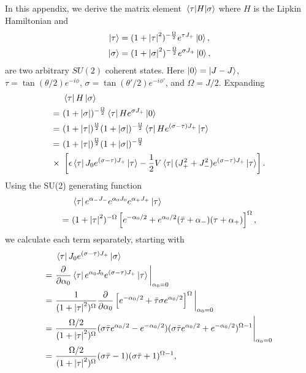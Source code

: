 \documentclass[10pt]{article}
\begin{document}
\begin{appendices}
In this appendix, we derive the matrix element $\mel{\tau}{H}{\sigma}$ where $H$ is the Lipkin Hamiltonian and
\begin{align}
\ket{\tau}&=(1+\abs{\tau}^2)^{-\frac{\Omega}{2}}e^{\tau J_+}\ket{0},
\\
\ket{\sigma}&=(1+\abs{\sigma}^2)^{-\frac{\Omega}{2}}e^{\sigma J_+}\ket{0}
,\end{align}
are two arbitrary $SU(2)$ coherent states. Here $\ket{0}=\ket{J-J}$, $\tau=\tan(\theta/2)e^{-i\phi}$, $\sigma=\tan(\theta'/2)e^{-i\phi'}$, and $\Omega=J/2$. Expanding
\begin{align}
&\bra{\tau}H\ket{\sigma}
\\
= \ &
(1+\abs{\sigma})^{-\frac{\Omega}{2}}\bra{\tau}He^{\sigma J_+}\ket{0}
\\
= \ &
(1+\abs{\tau})^{\frac{\Omega}{2}}(1+\abs{\sigma})^{-\frac{\Omega}{2}}\bra{\tau}He^{(\sigma-\tau) J_+}\ket{\tau}
\\
= \ &
(1+\abs{\tau})^{\frac{\Omega}{2}}(1+\abs{\sigma})^{-\frac{\Omega}{2}}
\\
\times \ &
\left[\epsilon\bra{\tau}J_0e^{(\sigma-\tau) J_+}\ket{\tau}-\frac{1}{2}V\bra{\tau}(J^2_++J^2_-)e^{(\sigma-\tau) J_+}\ket{\tau}\right].
\end{align}
Using the SU(2) generating function
\begin{align}
&\bra{\tau}e^{\alpha_-J_-}e^{\alpha_0J_0}e^{\alpha_+J_+}\ket{\tau}
\\
= \ &
(1+\abs{\tau}^2)^{-\Omega}\left[e^{-\alpha_0/2}+e^{\alpha_0/2}(\bar{\tau}+\alpha_-)(\tau+\alpha_+)\right]^{\Omega},
\end{align}
we calculate each term separately, starting with
\begin{align}
&\bra{\tau}J_0e^{(\sigma-\tau) J_+}\ket{\sigma}
\nonumber
\\
= \ &
\frac{\partial}{\partial\alpha_0}\bra{\tau}e^{\alpha_0J_0}e^{(\sigma-\tau) J_+}\ket{\tau}\bigg{|}_{\alpha_0=0}
\nonumber
\\
= \ &
\frac{1}{(1+\abs{\tau}^2)^{\Omega}}\frac{\partial}{\partial\alpha_0}\left[e^{-\alpha_0/2}+\bar{\tau}\sigma e^{\alpha_0/2}\right]^{\Omega}\bigg{|}_{\alpha_0=0}
\nonumber
\\
= \ &
\frac{\Omega/2}{(1+\abs{\tau}^2)^{\Omega}}(\sigma\bar{\tau}e^{\alpha_0/2}-e^{-\alpha_0/2})(\sigma\bar{\tau}e^{\alpha_0/2}+e^{-\alpha_0/2})^{\Omega-1}\Bigg{|}_{\alpha_0=0}
\nonumber
\\
= \ &
\frac{\Omega/2}{(1+\abs{\tau}^2)^{\Omega}}(\sigma\bar{\tau}-1)(\sigma\bar{\tau}+1)^{\Omega-1},
\end{align}

\end{appendices}
\end{document}
